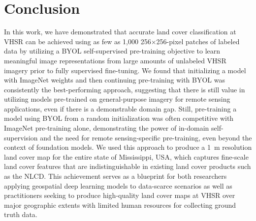 \section{Conclusion}

In this work, we have demonstrated that accurate land cover classification at VHSR can be achieved using as few as 1,000 256\(\times\)256-pixel patches of labeled data by utilizing a BYOL self-supervised pre-training objective to learn meaningful image representations from large amounts of unlabeled VHSR imagery prior to fully supervised fine-tuning.
We found that initializing a model with ImageNet weights and then continuing pre-training with BYOL was consistently the best-performing approach, suggesting that there is still value in utilizing models pre-trained on general-purpose imagery for remote sensing applications, even if there is a demonstrable domain gap.
Still, pre-training a model using BYOL from a random initialization was often competitive with ImageNet pre-training alone, demonstrating the power of in-domain self-supervision and the need for remote sensing-specific pre-training, even beyond the context of foundation models.
We used this approach to produce a \SI{1}{\meter} resolution land cover map for the entire state of Mississippi, USA, which captures fine-scale land cover features that are indistinguishable in existing land cover products such as the NLCD.
This achievement serves as a blueprint for both researchers applying geospatial deep learning models to data-scarce scenarios as well as practitioners seeking to produce high-quality land cover maps at VHSR over major geographic extents with limited human resources for collecting ground truth data.



